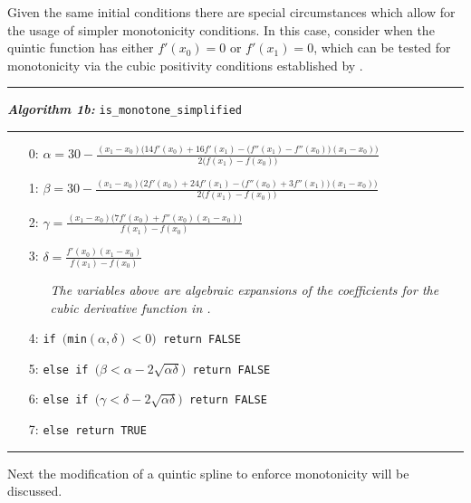 \documentclass{article}
\begin{document}
Given the same initial conditions there are special circumstances which allow for the usage of simpler monotonicity conditions. In this case, consider when the quintic function has either $f'(x_0) = 0$ or $f'(x_1) = 0$, which can be tested for monotonicity via the cubic positivity conditions established by \cite{schmidt1988positivity}.

\vspace{10pt}
\hrule
\vspace{3pt}
\noindent\textbf{\textit{Algorithm 1b:}} \texttt{is\_monotone\_simplified}
\vspace{3pt}
\hrule
\begin{itemize}
  \itemsep0pt
  \parskip0pt

\item[0:] $\alpha = 30 - \frac{(x_1 - x_0)\big( 14 f'(x_0) + 16 f'(x_1) - \big(f''(x_1) - f''(x_0) \big) (x_1 - x_0)\big)}{2\big(f(x_1) - f(x_0)\big)}$
\item[1:] $\beta = 30 - \frac{(x_1 - x_0)\big( 2 f'(x_0) + 24 f'(x_1) - \big(f''(x_0) + 3 f''(x_1) \big) (x_1 - x_0)\big)}{2\big(f(x_1) - f(x_0)\big)}$
\item[2:] $\gamma = \frac{(x_1 - x_0)\big( 7 f'(x_0) + f''(x_0) (x_1 - x_0) \big)}{f(x_1) - f(x_0)}$
\item[3:] $\delta = \frac{f'(x_0) (x_1 - x_0)}{f(x_1) - f(x_0)}$

  \begin{itemize}
    \item[] \textit{The variables above are algebraic expansions of the coefficients for the cubic derivative function in \cite{schmidt1988positivity}.}
  \end{itemize}

\item[4:] \texttt{if $\big($min$(\alpha, \delta) < 0\big)$ return FALSE}
\item[5:] \texttt{else if $\big(\beta < \alpha - 2 \sqrt{\alpha \delta}\big)$ return FALSE}
\item[6:] \texttt{else if $\big(\gamma < \delta - 2 \sqrt{\alpha \delta}\big)$ return FALSE}
\item[7:] \texttt{else return TRUE}

\end{itemize}
\hrule
\vspace{10pt}

Next the modification of a quintic spline to enforce monotonicity will be discussed.
\end{document}
